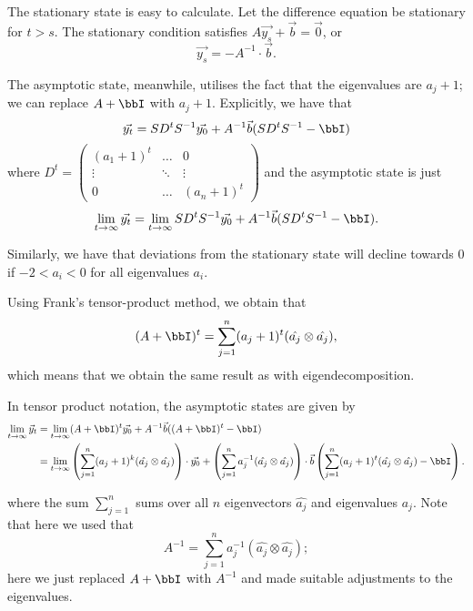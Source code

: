 \documentclass[a4paper, 12pt,oneside,openany]{book}
\begin{document}
The stationary state is easy to calculate. Let the difference equation be stationary for $t>s.$ The stationary condition satisfies $A \vec{y_s} + \vec{b}=\vec{0}$, or $$\vec{y_s} = -A^{-1} \cdot \vec{b}.$$

The asymptotic state, meanwhile, utilises the fact that the eigenvalues are $a_j+1$; we can replace $A+\bbI$ with $a_j+1$. Explicitly, we have that $$\vec{y_t} = SD^tS^{-1}\vec{y_0} + A^{-1}\vec{b}(SD^tS^{-1}-\bbI)$$ where $D^t = \begin{pmatrix} (a_1+1)^t & \dots & 0 \\ \vdots & \ddots & \vdots \\ 0 & \dots & (a_n+1)^t \end{pmatrix}$ and the asymptotic state is just $$\lim\limits_{t\to\infty} \vec{y_t} = \lim\limits_{t\to\infty} SD^tS^{-1}\vec{y_0} + A^{-1}\vec{b}(SD^tS^{-1}-\bbI).$$

Similarly, we have that deviations from the stationary state will decline towards 0 if $-2<a_i<0$ for all eigenvalues $a_i$. 

Using Frank's tensor-product method, we obtain that $$(A+\bbI)^t = \sum\limits_{j=1}^n (a_j+1)^t (\hat{a_j} \otimes \hat{a_j}),$$ which means that we obtain the same result as with eigendecomposition.

In tensor product notation, the asymptotic states are given by \begin{align*} \lim\limits_{t\to\infty} \vec{y}_t &=\lim\limits_{t\to\infty} (A+\bbI)^t \vec{y_0}+A^{-1}\vec{b}((A+\bbI)^t-\bbI) \\ &= \lim\limits_{t\to\infty} \left(\sum\limits_{j=1}^n (a_j+1)^k (\hat{a_j} \otimes\hat{a_j}) \right) \cdot \vec{y_0}+ \left(\sum\limits_{j=1}^n a_j^{-1} (\hat{a_j} \otimes \hat{a_j})\right) \cdot \vec{b} \left(\sum\limits_{j=1}^n (a_j+1)^t (\hat{a_j} \otimes\hat{a_j}) -\bbI\right). \end{align*}

where the sum $\sum\limits_{j=1}^n$ sums over all $n$ eigenvectors $\hat{a_j}$ and eigenvalues $a_j$. Note that here we used that $$A^{-1}=\sum\limits_{j=1}^n a_j^{-1} (\hat{a_j} \otimes \hat{a_j});$$ here we just replaced $A+\bbI$ with $A^{-1}$ and made suitable adjustments to the eigenvalues. 
\end{document}
